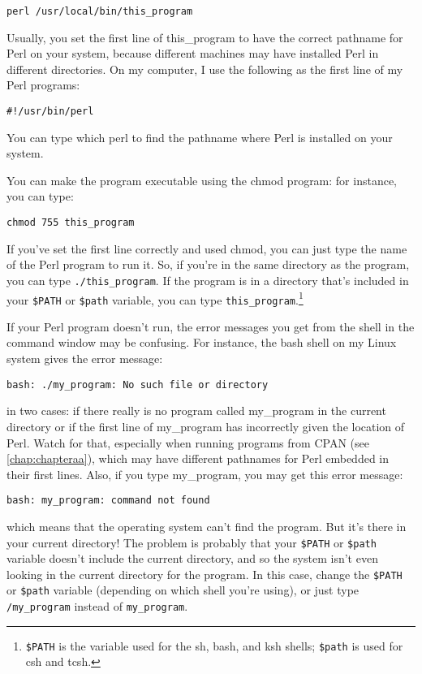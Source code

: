 \verb|perl /usr/local/bin/this_program|

Usually, you set the first line of this\_program to have the correct pathname for Perl on your system, because different machines may have installed Perl in different directories. On my computer, I use the following as the first line of my Perl programs:

\verb|#!/usr/bin/perl|

You can type which perl to find the pathname where Perl is installed on your system.

You can make the program executable using the chmod program: for instance, you can type:

\verb|chmod 755 this_program|

If you've set the first line correctly and used chmod, you can just type
the name of the Perl program to run it. So, if you're in the same
directory as the program, you can type \verb|./this_program|. If the
program is in a directory that's included in your \verb|$PATH| or
\verb|$path| variable, you can type \verb|this_program|.\footnote{\verb|$PATH| is the variable used for the sh, bash, and ksh shells; \verb|$path| is used for csh and tcsh.}

If your Perl program doesn't run, the error messages you get from the shell in the command window may be confusing. For instance, the bash shell on my Linux system gives the error message:

\verb|bash: ./my_program: No such file or directory|

in two cases: if there really is no program called my\_program in the current directory or if the first line of my\_program has incorrectly given the location of Perl. Watch for that, especially when running programs from CPAN (see \ref{chap:chapteraa}), which may have different pathnames for Perl embedded in their first lines. Also, if you type my\_program, you may get this error message:

\verb|bash: my_program: command not found|

which means that the operating system can't find the program. But it's
there in your current directory! The problem is probably that your
\verb|$PATH| or \verb|$path| variable doesn't include the current
directory, and so the system isn't even looking in the current directory
for the program. In this case, change the \verb|$PATH| or \verb|$path| variable (depending on which shell you're using), or just type \verb|/my_program| instead of \verb|my_program|.  

